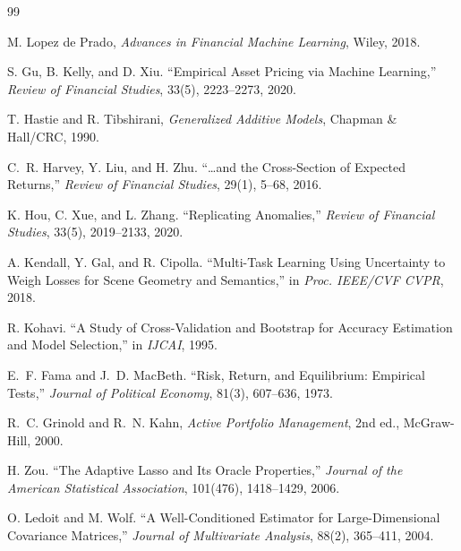\documentclass[11pt]{article}
\begin{document}

\begin{thebibliography}{99}

M. Lopez de Prado, \emph{Advances in Financial Machine Learning},
Wiley, 2018.

S. Gu, B. Kelly, and D. Xiu. ``Empirical Asset Pricing via Machine
Learning,'' \emph{Review of Financial Studies}, 33(5), 2223--2273, 2020.

T. Hastie and R. Tibshirani, \emph{Generalized Additive Models},
Chapman \& Hall/CRC, 1990.

C.~R. Harvey, Y. Liu, and H. Zhu. ``\dots and the Cross-Section
of Expected Returns,'' \emph{Review of Financial Studies}, 29(1),
5--68, 2016.

K. Hou, C. Xue, and L. Zhang. ``Replicating Anomalies,''
\emph{Review of Financial Studies}, 33(5), 2019--2133, 2020.

A. Kendall, Y. Gal, and R. Cipolla. ``Multi-Task Learning Using
Uncertainty to Weigh Losses for Scene Geometry and Semantics,''
in \emph{Proc. IEEE/CVF CVPR}, 2018.

R. Kohavi. ``A Study of Cross-Validation and Bootstrap for Accuracy
Estimation and Model Selection,'' in \emph{IJCAI}, 1995.

E.~F. Fama and J.~D. MacBeth. ``Risk, Return, and Equilibrium:
Empirical Tests,'' \emph{Journal of Political Economy}, 81(3),
607--636, 1973.

R.~C. Grinold and R.~N. Kahn, \emph{Active Portfolio Management},
2nd ed., McGraw-Hill, 2000.

H. Zou. ``The Adaptive Lasso and Its Oracle Properties,''
\emph{Journal of the American Statistical Association}, 101(476),
1418--1429, 2006.

O. Ledoit and M. Wolf. ``A Well-Conditioned Estimator for
Large-Dimensional Covariance Matrices,'' \emph{Journal of Multivariate
Analysis}, 88(2), 365--411, 2004.


\end{thebibliography}
\end{document}
